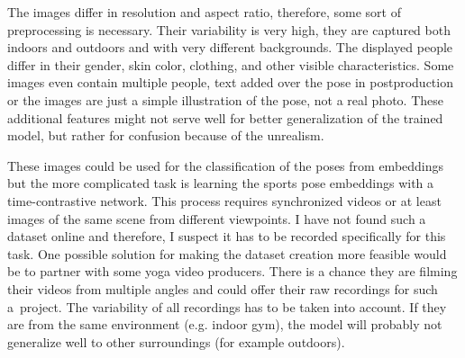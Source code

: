 The images differ in resolution and aspect ratio, therefore, some sort of preprocessing is necessary. Their variability is very high, they are captured both indoors and outdoors and with very different backgrounds. The displayed people differ in their gender, skin color, clothing, and other visible characteristics. Some images even contain multiple people, text added over the pose in postproduction or the images are just a simple illustration of the pose, not a real photo. These additional features might not serve well for better generalization of the trained model, but rather for confusion because of the unrealism.

These images could be used for the classification of the poses from embeddings but the more complicated task is learning the sports pose embeddings with a time-contrastive network. This process requires synchronized videos or at least images of the same scene from different viewpoints. I have not found such a dataset online and therefore, I suspect it has to be recorded specifically for this task. One possible solution for making the dataset creation more feasible would be to partner with some yoga video producers. There is a chance they are filming their videos from multiple angles and could offer their raw recordings for such a~project. The variability of all recordings has to be taken into account. If they are from the same environment (e.g. indoor gym), the model will probably not generalize well to other surroundings (for example outdoors).
